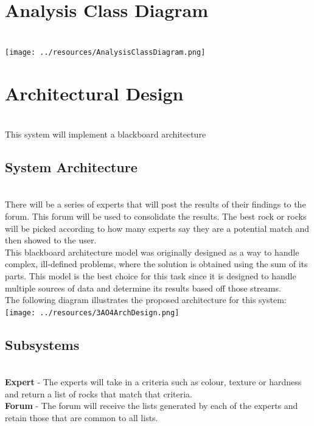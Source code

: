 \documentclass[titlepage]{article}
\begin{document}
\section{Analysis Class Diagram}~\\
 \texttt{[image: ../resources/AnalysisClassDiagram.png]}
 

\section{Architectural Design}~\\
This system will implement a blackboard architecture 
\subsection{System Architecture}~\\

There will be a series of experts that will post the results of their findings to the forum. This forum will be used to consolidate the results. The best rock or rocks will be picked according to how many experts say they are a potential match and then showed to the user.\\

This blackboard architecture model was originally designed as a way to handle complex, ill-defined problems, where the solution is obtained using the sum of its parts. This model is the best choice for this task since it is designed to handle multiple sources of data and determine its results based off those streams.\\

The following diagram illustrates the proposed architecture for this system:\\

\texttt{[image: ../resources/3AO4ArchDesign.png]}

\subsection{Subsystems}~\\

\textbf{Expert} - The experts will take in a criteria such as colour, texture or hardness and return a list of rocks that match that criteria.\\

\textbf{Forum} - The forum will receive the lists generated by each of the experts and retain those that are common to all lists.\\
\end{document}
